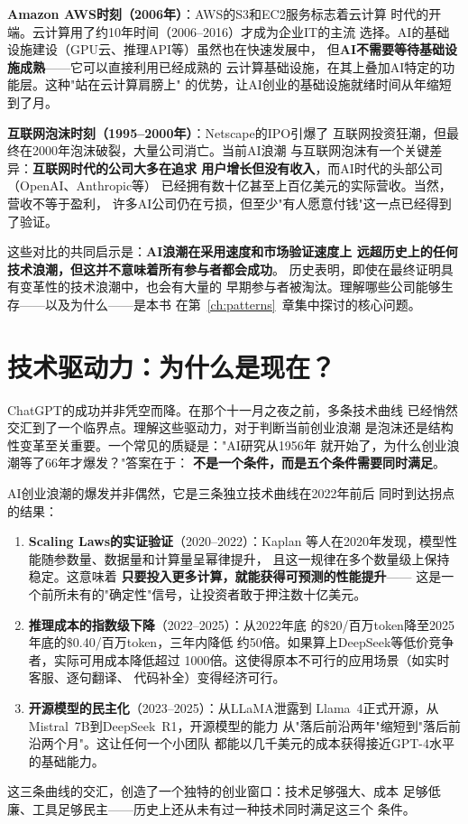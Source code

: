 \textbf{Amazon AWS时刻（2006年）}：AWS的S3和EC2服务标志着云计算
时代的开端。云计算用了约10年时间（2006--2016）才成为企业IT的主流
选择。AI的基础设施建设（GPU云、推理API等）虽然也在快速发展中，
但\textbf{AI不需要等待基础设施成熟}——它可以直接利用已经成熟的
云计算基础设施，在其上叠加AI特定的功能层。这种"站在云计算肩膀上"
的优势，让AI创业的基础设施就绪时间从年缩短到了月。

\textbf{互联网泡沫时刻（1995--2000年）}：Netscape的IPO引爆了
互联网投资狂潮，但最终在2000年泡沫破裂，大量公司消亡。当前AI浪潮
与互联网泡沫有一个关键差异：\textbf{互联网时代的公司大多在追求
用户增长但没有收入}，而AI时代的头部公司（OpenAI、Anthropic等）
已经拥有数十亿甚至上百亿美元的实际营收。当然，营收不等于盈利，
许多AI公司仍在亏损，但至少"有人愿意付钱"这一点已经得到了验证。

这些对比的共同启示是：\textbf{AI浪潮在采用速度和市场验证速度上
远超历史上的任何技术浪潮，但这并不意味着所有参与者都会成功}。
历史表明，即使在最终证明具有变革性的技术浪潮中，也会有大量的
早期参与者被淘汰。理解哪些公司能够生存——以及为什么——是本书
在第~\ref{ch:patterns}~章集中探讨的核心问题。


\section{技术驱动力：为什么是现在？}
\label{sec:overview-why-now}

ChatGPT的成功并非凭空而降。在那个十一月之夜之前，多条技术曲线
已经悄然交汇到了一个临界点。理解这些驱动力，对于判断当前创业浪潮
是泡沫还是结构性变革至关重要。一个常见的质疑是："AI研究从1956年
就开始了，为什么创业浪潮等了66年才爆发？"答案在于：
\textbf{不是一个条件，而是五个条件需要同时满足}。

\begin{whybox}
AI创业浪潮的爆发并非偶然，它是三条独立技术曲线在2022年前后
同时到达拐点的结果：
\begin{enumerate}
  \item \textbf{Scaling Laws的实证验证}（2020--2022）：Kaplan
    等人在2020年发现，模型性能随参数量、数据量和计算量呈幂律提升，
    且这一规律在多个数量级上保持稳定。这意味着
    \textbf{只要投入更多计算，就能获得可预测的性能提升}——
    这是一个前所未有的"确定性"信号，让投资者敢于押注数十亿美元。
  \item \textbf{推理成本的指数级下降}（2022--2025）：从2022年底
    的\$20/百万token降至2025年底的\$0.40/百万token，三年内降低
    约50倍。如果算上DeepSeek等低价竞争者，实际可用成本降低超过
    1000倍。这使得原本不可行的应用场景（如实时客服、逐句翻译、
    代码补全）变得经济可行。
  \item \textbf{开源模型的民主化}（2023--2025）：从LLaMA泄露到
    Llama~4正式开源，从Mistral~7B到DeepSeek~R1，开源模型的能力
    从"落后前沿两年"缩短到"落后前沿两个月"。这让任何一个小团队
    都能以几千美元的成本获得接近GPT-4水平的基础能力。
\end{enumerate}
这三条曲线的交汇，创造了一个独特的创业窗口：技术足够强大、成本
足够低廉、工具足够民主——历史上还从未有过一种技术同时满足这三个
条件。
\end{whybox}

